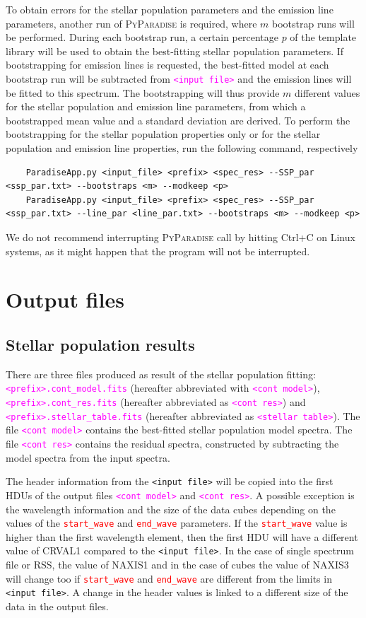 \documentclass[usenatbib,usegraphicx,useAMS,onecolumn]{mn2e}
\newcommand{\codeline}[1]{\lstinline|#1|}
\newcommand{\paramdef}[1]{\textcolor{red}{\codeline{#1}}}
\newcommand{\fname}[1]{\textcolor{magenta}{\codeline{#1}}}
\begin{document}
To obtain errors for the stellar population parameters and the emission line parameters, another run of \textsc{PyParadise} is required, where $m$ bootstrap runs will be performed.
During each bootstrap run, a certain percentage $p$ of the template library will be used to obtain the best-fitting stellar population parameters.
If bootstrapping for emission lines is requested, the best-fitted model at each bootstrap run will be subtracted from \fname{<input file>} and the emission lines will be fitted to this spectrum.
The bootstrapping will thus provide $m$ different values for the stellar population and emission line parameters, from which a bootstrapped mean value and a standard deviation are derived.
To perform the bootstrapping for the stellar population properties only or for the stellar population and emission line properties, run the following command, respectively
\begin{lstlisting}
    ParadiseApp.py <input_file> <prefix> <spec_res> --SSP_par <ssp_par.txt> --bootstraps <m> --modkeep <p>
    ParadiseApp.py <input_file> <prefix> <spec_res> --SSP_par <ssp_par.txt> --line_par <line_par.txt> --bootstraps <m> --modkeep <p>
\end{lstlisting}

We do not recommend interrupting \textsc{PyParadise} call by hitting Ctrl+C on Linux systems, as it might happen that the program will not be interrupted.

\section{Output files}
\label{subsec:usage_output}
\subsection{Stellar population results}
\label{subsec:usage_output_ssp}
There are three files produced as result of the stellar population fitting: \fname{<prefix>.cont_model.fits} (hereafter abbreviated with \fname{<cont model>}), \fname{<prefix>.cont_res.fits} (hereafter abbreviated as \fname{<cont res>}) and \fname{<prefix>.stellar_table.fits} (hereafter abbreviated as \fname{<stellar table>}).
The file \fname{<cont model>} contains the best-fitted stellar population model spectra.
The file \fname{<cont res>} contains the residual spectra, constructed by subtracting the model spectra from the input spectra.

The header information from the \texttt{<input file>} will be copied into the first HDUs of the output files \fname{<cont model>} and \fname{<cont res>}.
A possible exception is the wavelength information and the size of the data cubes depending on the values of the \paramdef{start_wave} and \paramdef{end_wave} parameters.
If the \paramdef{start_wave} value is higher than the first wavelength element, then the first HDU will have a different value of \textsc{CRVAL1} compared to the \texttt{<input file>}.
In the case of single spectrum file or RSS, the value of \textsc{NAXIS1} and in the case of cubes the value of \textsc{NAXIS3} will change too if \paramdef{start_wave} and \paramdef{end_wave} are different from the limits in \texttt{<input file>}.
A change in the header values is linked to a different size of the data in the output files.
\end{document}
